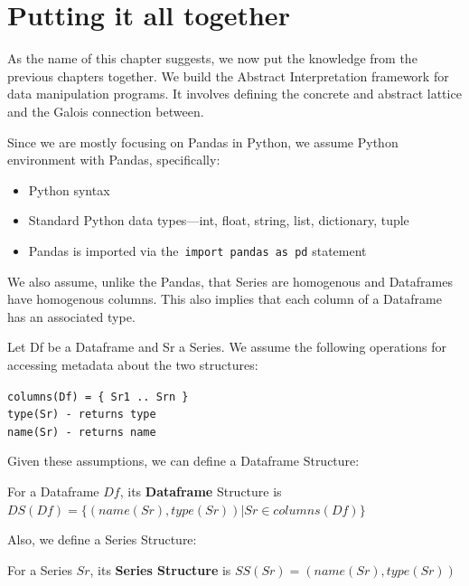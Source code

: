 \chapter{Putting it all together}\label{ch:putting-it-all-together}

As the name of this chapter suggests, we now put the knowledge from the previous chapters together.
We build the Abstract Interpretation framework for data manipulation programs.
It involves defining the concrete and abstract lattice and the Galois connection between.

Since we are mostly focusing on Pandas in Python, we assume Python environment with Pandas, specifically:

\begin{itemize}
    \item Python syntax
    \item Standard Python data types---int, float, string, list, dictionary, tuple
    \item Pandas is imported via the~\verb|import pandas as pd| statement
\end{itemize}

We also assume, unlike the Pandas, that Series are homogenous and Dataframes have homogenous columns.
This also implies that each column of a Dataframe has an associated type.

\begin{defn}
    Let Df be a Dataframe and Sr a Series.
    We assume the following operations for accessing metadata about the two structures:

    \verb|columns(Df) = { Sr1 .. Srn }| \\

    \verb|type(Sr) - returns type| \\

    \verb|name(Sr) - returns name| \\
\end{defn}

Given these assumptions, we can define a Dataframe Structure:

\begin{defn}
    For a Dataframe $Df$, its \textbf{Dataframe} Structure is $DS(Df) = \{ (name(Sr), type(Sr)) | Sr \in columns(Df) \}$
\end{defn}

Also, we define a Series Structure:

\begin{defn}
    For a Series $Sr$, its \textbf{Series Structure} is $SS(Sr) = (name(Sr), type(Sr))$
\end{defn}


